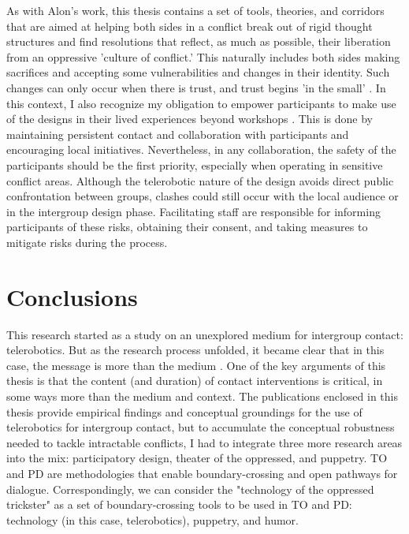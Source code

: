 \documentclass[dissertation,math,vertlayout,pdfa,colorlinks]{aaltoseries}
\begin{document}
As with Alon's work, this thesis contains a set of tools, theories, and corridors that are aimed at helping both sides in a conflict break out of rigid thought structures and find resolutions that reflect, as much as possible, their liberation from an oppressive 'culture of conflict.' This naturally includes both sides making sacrifices and accepting some vulnerabilities and changes in their identity. Such changes can only occur when there is trust, and trust begins 'in the small' \cite{bodkerAfterthoughtsEmergentFuture2025, manziniDesignWhenEverybody2015}. In this context, I also recognize my obligation to empower participants to make use of the designs in their lived experiences beyond workshops \cite{geppertDesignEquivalenceAgonism2022}. This is done by maintaining persistent contact and collaboration with participants and encouraging local initiatives. Nevertheless, in any collaboration, the safety of the participants should be the first priority, especially when operating in sensitive conflict areas. Although the telerobotic nature of the design avoids direct public confrontation between groups, clashes could still occur with the local audience or in the intergroup design phase. Facilitating staff are responsible for informing participants of these risks, obtaining their consent, and taking measures to mitigate risks during the process.



\chapter{Conclusions}
This research started as a study on an unexplored medium for intergroup contact: telerobotics. But as the research process unfolded, it became clear that in this case, the message is more than the medium \cite{mcluhanUnderstandingMediaExtensions1994}. One of the key arguments of this thesis is that the content (and duration) of contact interventions is critical, in some ways more than the medium and context. The publications enclosed in this thesis provide empirical findings and conceptual groundings for the use of telerobotics for intergroup contact, but to accumulate the conceptual robustness needed to tackle intractable conflicts, I had to integrate three more research areas into the mix: participatory design, theater of the oppressed, and puppetry. TO and PD are methodologies that enable boundary-crossing and open pathways for dialogue. Correspondingly, we can consider the "technology of the oppressed trickster" as a set of boundary-crossing tools to be used in TO and PD: technology (in this case, telerobotics), puppetry, and humor.
\end{document}
